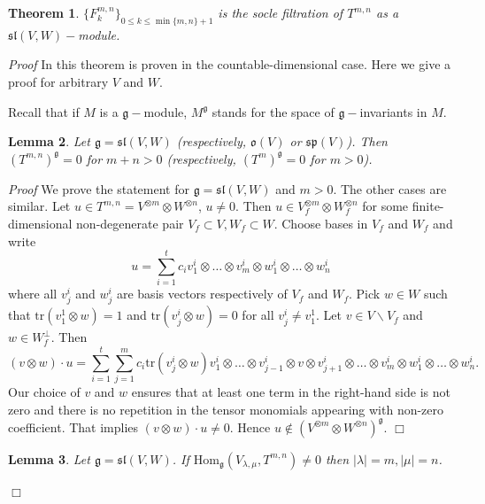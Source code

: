 \documentclass[10pt]{amsart}
\newcounter{theorem}
\newtheorem{theo}{Theorem}[section]
\newtheorem{lemma}[theo]{Lemma}
\renewenvironment{proof}{ \emph{Proof}}{$\Box$}
\renewcommand{\sp}{\mathfrak{sp}}
\renewcommand{\sl}{\mathfrak{sl}}
\newcommand{\oo}{\mathfrak{o}}
\renewcommand{\gg}{\mathfrak{g}}
\newcommand{\tr}{\mathrm{tr}}
\newcommand{\Hom}{\mathrm{Hom}}
\begin{document}
\begin{theo}\label{soc-sl} $\lbrace F^{m,n}_k\rbrace_{0\leq k\leq \min\lbrace m,n\rbrace+1}$ is the socle filtration of $T^{m,n}$ as a $\sl(V,W)-$module.
\end{theo}

\begin{proof}
In \cite{pstyr} this theorem is proven in the countable-dimensional case. Here we give a proof for arbitrary $V$ and $W$.

Recall that if $M$ is a $\gg-$module, $M^\gg$ stands for the space of $\gg-$invariants in $M$.

\begin{lemma}\label{inv} Let $\gg=\sl(V,W)$ (respectively, $\oo(V)$ or $\sp(V)$). Then $(T^{m,n})^\gg=0$ for $m+n>0$ 
(respectively, $(T^m)^\gg=0$ for $m>0$).
\end{lemma}
\begin{proof} We prove the statement for $\gg=\sl(V,W)$ and $m>0$. The other cases are similar. Let $u\in T^{m,n} = V^{\otimes m}\otimes W^{\otimes n}$, $u\neq 0$. Then  $u\in V_f^{\otimes m}\otimes W_f^{\otimes n}$ for some finite-dimensional non-degenerate pair $V_f\subset V, W_f\subset W$. Choose bases in $V_f$ and $W_f$ and write $$u=\sum_{i=1}^tc_i v^i_1\otimes\dots\otimes v^i_m\otimes w^i_1\otimes\dots\otimes w^i_n$$ where all $v^i_j$ and $w^i_j$ are basis vectors respectively of $V_f$ and $W_f$. Pick $w\in W$ such that $\tr(v^1_1 \otimes w)=1$ and $\tr(v^i_j \otimes w)=0$ for all $v^i_j\neq v^1_1$. Let $v\in V \backslash V_f$ and $w\in W_f^\perp$. Then $$(v \otimes w)\cdot u =\sum_{i=1}^t\sum_{j=1}^mc_i \tr(v^i_j\otimes w) v^i_1\otimes\dots\otimes v^i_{j-1}\otimes v\otimes v^i_{j+1}\otimes\dots\otimes v^i_m\otimes w^i_1\otimes\dots\otimes w^i_n.$$ Our choice of $v$ and $w$ ensures that at least one term in the right-hand side is not zero and there is no repetition in the tensor monomials appearing 
with non-zero 
coefficient. That implies $(v \otimes w)\cdot u \neq 0$. Hence $u\notin  (V^{\otimes m}\otimes W^{\otimes n})^\gg$.
\end{proof}

\begin{lemma}\label{soclemma1} Let $\gg = \sl(V,W)$. If $\Hom_\gg(V_{\lambda,\mu}, T^{m,n})\neq 0$ then $|\lambda|=m,|\mu|=n$.
\end{lemma}


\end{proof}
\end{document}
